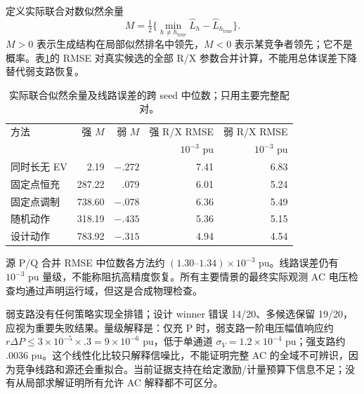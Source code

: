 \documentclass[UTF8,fontset=fandol,11pt,a4paper]{ctexart}
\begin{document}
定义实际联合对数似然余量
\[
M=\tfrac12\{\min_{h\ne h_{\mathrm{true}}}\widehat L_h-\widehat L_{h_{\mathrm{true}}}\}.
\]
$M>0$ 表示生成结构在局部似然排名中领先，$M<0$ 表示某竞争者领先；它不是概率。表\ref{tab:parameter}的 RMSE 对真实候选的全部 R/X 参数合并计算，不能用总体误差下降替代弱支路恢复。
\begin{table}[htbp]\centering\small
\caption{实际联合似然余量及线路误差的跨 seed 中位数；只用主要完整配对。}\label{tab:parameter}
\begin{tabular}{lrrrr}\toprule
方法 & 强 $M$ & 弱 $M$ & 强 R/X RMSE & 弱 R/X RMSE\\
 & & & $10^{-3}$ pu & $10^{-3}$ pu\\\midrule
同时长无 EV & 2.19 & $-.272$ & 7.41 & 6.83\\
固定点恒充 & 287.22 & .079 & 6.01 & 5.24\\
固定点调制 & 738.60 & $-.078$ & 6.36 & 5.49\\
随机动作 & 318.19 & $-.435$ & 5.36 & 5.15\\
设计动作 & 783.92 & $-.315$ & 4.94 & 4.54\\\bottomrule
\end{tabular}
\end{table}
源 P/Q 合并 RMSE 中位数各方法约 $(1.30\text{--}1.34)\times10^{-3}$ pu。线路误差仍有 $10^{-3}$ pu 量级，不能称阻抗高精度恢复。所有主要情景的最终实际观测 AC 电压检查均通过声明运行域，但这是合成物理检查。

弱支路没有任何策略实现全排错；设计 winner 错误 14/20、多候选保留 19/20，应视为重要失败结果。量级解释是：仅充 P 时，弱支路一阶电压幅值响应约 $r\Delta P\le3\times10^{-5}\times.3=9\times10^{-6}$ pu，低于单通道 $\sigma_V=1.2\times10^{-4}$ pu；强支路约 $.0036$ pu。这个线性化比较只解释信噪比，不能证明完整 AC 的全域不可辨识，因为竞争线路和源还会重拟合。当前证据支持在给定激励/计量预算下信息不足；没有从局部求解证明所有允许 AC 解释都不可区分。
\end{document}
